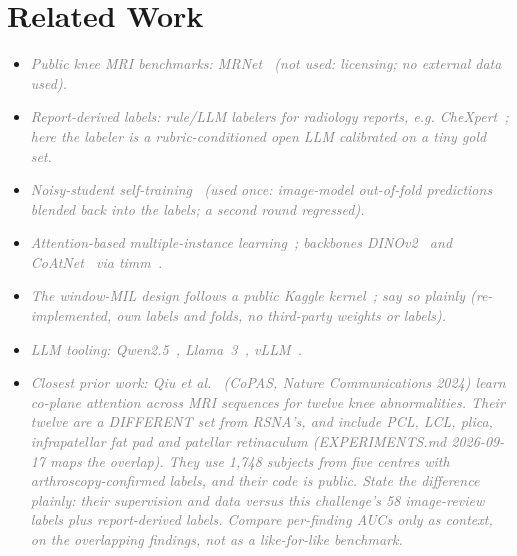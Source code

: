 \documentclass[conference]{IEEEtran}
\newcommand{\nt}[1]{\textcolor{gray}{\textit{#1}}}            %
\begin{document}
\section{Related Work}
\begin{notes}
\begin{itemize}
\item \nt{Public knee MRI benchmarks: MRNet~\cite{bien2018mrnet} (not used: licensing; no external data used).}
\item \nt{Report-derived labels: rule/LLM labelers for radiology reports, e.g. CheXpert~\cite{irvin2019chexpert}; here the
labeler is a rubric-conditioned open LLM calibrated on a tiny gold set.}
\item \nt{Noisy-student self-training~\cite{xie2020noisystudent} (used once: image-model out-of-fold predictions blended
back into the labels; a second round regressed).}
\item \nt{Attention-based multiple-instance learning~\cite{ilse2018attention}; backbones DINOv2~\cite{oquab2023dinov2} and
CoAtNet~\cite{dai2021coatnet} via timm~\cite{wightman2019timm}.}
\item \nt{The window-MIL design follows a public Kaggle kernel~\cite{dread2026kernel}; say so plainly (re-implemented, own
labels and folds, no third-party weights or labels).}
\item \nt{LLM tooling: Qwen2.5~\cite{qwen2025}, Llama~3~\cite{llama3}, vLLM~\cite{kwon2023vllm}.}
\item \nt{Closest prior work: Qiu et al.~\cite{qiu2024coplane} (CoPAS, Nature Communications 2024) learn co-plane attention
across MRI sequences for twelve knee abnormalities. Their twelve are a DIFFERENT set from RSNA's, and include PCL, LCL,
plica, infrapatellar fat pad and patellar retinaculum (EXPERIMENTS.md 2026-09-17 maps the overlap). They use 1,748
subjects from five centres with arthroscopy-confirmed labels, and their code is public. State the difference plainly:
their supervision and data versus this challenge's 58 image-review labels plus report-derived labels. Compare per-finding
AUCs only as context, on the overlapping findings, not as a like-for-like benchmark.}
\end{itemize}
\end{notes}
\end{document}
